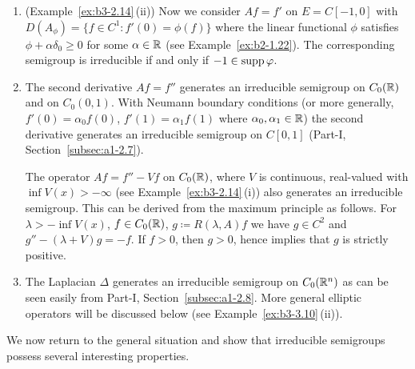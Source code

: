\begin{examples}
\begin{enumerate}[\upshape (i), wide, labelindent=.25em]
	\item 
	(\cf Example~\ref{ex:b3-2.14}\,(ii)) Now we consider $Af = f'$ on $E = C[-1,0]$ with $D(A_{\phi}) = \{f \in C^1 \colon f'(0) = \phi(f)\}$ where the linear functional $\phi$ satisfies $\phi + \alpha\delta_{0} \geq 0$ for some $\alpha \in \mathbb{R}$ (see Example~\ref{ex:b2-1.22}).
	The corresponding semigroup is irreducible if and only if\/ $-1 \in \supp\phi$.
	
	\item 
	The second derivative $Af = f''$ generates an irreducible semigroup on $C_{0}(\mathbb{R})$ and on $C_{0}(0,1)$.
	With Neumann boundary conditions (or more generally, $f'(0) = \alpha_{0}f(0)$, $f'(1) = \alpha_{1}f(1)$ where $\alpha_{0}, \alpha_{1} \in \mathbb{R}$) the second derivative generates an irreducible semigroup on $C[0,1]$ (\cf Part-I, Section~\ref{subsec:a1-2.7}).
	
	The operator $Af = f'' - Vf$ on $C_{0}(\mathbb{R})$, where $V$ is continuous, real-valued with $\inf V(x) > -\infty$ (see Example~\ref{ex:b3-2.14}\,(i)) also generates an irreducible semigroup.
	This can be derived from the maximum principle as follows. 
    For $\lambda > -\inf V(x)$, $f \in C_{0}(\mathbb{R})$, $g \coloneq R(\lambda,A)f$ we have $g \in C^2$ and $g'' - (\lambda + V)g = -f$.
	If\/ $f > 0$, then $g > 0$, hence \textcite[Chap.~I, Theorem~3]{protterweinberger:1967} implies that $g$ is strictly positive.
	
	\item 
	The Laplacian 
    $\Delta$ generates an irreducible semigroup on $C_{0}(\mathbb{R}^n)$ as can be seen easily from Part-I, Section~\ref{subsec:a1-2.8}.
	More general elliptic operators will be discussed below (see Example~\ref{ex:b3-3.10}\,(ii)).
\end{enumerate}
\end{examples}
We now return to the general situation and show that irreducible semigroups possess several interesting properties.
